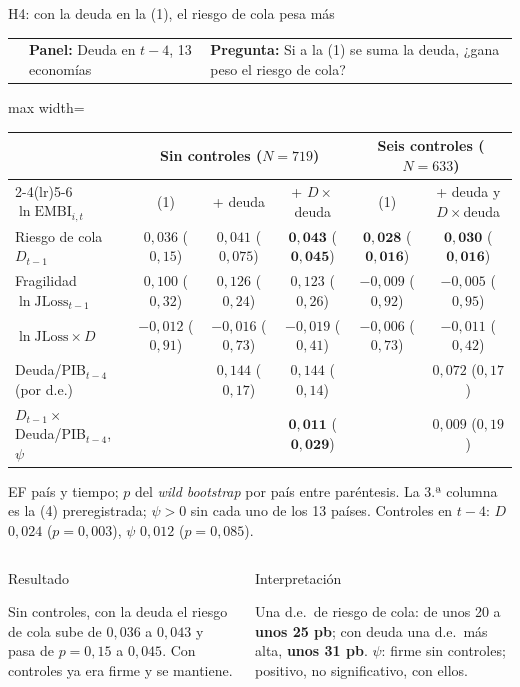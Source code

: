 \documentclass[aspectratio=169]{beamer}
\makeatletter
\newcommand{\JLoss}{\mathrm{JLoss}}
\newcommand{\EMBI}{\mathrm{EMBI}}
\newcommand{\franja}[3]{\par\vspace{-6pt}\noindent
\colorbox{tesisblue!10}{\begin{minipage}{\dimexpr\textwidth-2\fboxsep\relax}\scriptsize
\begin{tabular}{@{}>{\raggedright\arraybackslash}p{0.13\textwidth}@{\hspace{8pt}}>{\raggedright\arraybackslash}p{0.25\textwidth}@{\hspace{8pt}}>{\raggedright\arraybackslash}p{0.52\textwidth}@{}}
{\color{tesisblue}\bfseries Ecuación #1} & \textbf{Panel:} #2 & \textbf{Pregunta:} #3
\end{tabular}\end{minipage}}\par\vspace{4pt}}
\newcommand{\cajas}[2]{\par\vspace{4pt}
\begin{columns}[T]
\column{0.49\textwidth}
\begin{block}{Resultado}\scriptsize\raggedright #1\end{block}
\column{0.49\textwidth}
\begin{exampleblock}{Interpretación}\scriptsize\raggedright #2\end{exampleblock}
\end{columns}}
\makeatother
\begin{document}
\begin{frame}{H4: con la deuda en la (1), el riesgo de cola pesa más}
\franja{(1) + (4)}{Deuda en $t-4$, 13 economías}{Si a la (1) se suma la deuda, ¿gana peso el riesgo de cola?}
\centering
\footnotesize
\begin{adjustbox}{max width=\textwidth}
\begin{tabular}{l ccc cc}
\toprule
& \multicolumn{3}{c}{Sin controles ($N=719$)} & \multicolumn{2}{c}{Seis controles ($N=633$)} \\
\cmidrule(lr){2-4}\cmidrule(lr){5-6}
$\ln\EMBI_{i,t}$ & (1) & + deuda & + $D\times$deuda & (1) & + deuda y $D\times$deuda \\
\midrule
Riesgo de cola $D_{t-1}$ & $0{,}036$ \;($0{,}15$) & $0{,}041$ \;($0{,}075$) & $\mathbf{0{,}043}$ \;($\mathbf{0{,}045}$) & $\mathbf{0{,}028}$ \;($\mathbf{0{,}016}$) & $\mathbf{0{,}030}$ \;($\mathbf{0{,}016}$) \\
Fragilidad $\ln\JLoss_{t-1}$ & $0{,}100$ \;($0{,}32$) & $0{,}126$ \;($0{,}24$) & $0{,}123$ \;($0{,}26$) & $-0{,}009$ \;($0{,}92$) & $-0{,}005$ \;($0{,}95$) \\
$\ln\JLoss\times D$ & $-0{,}012$ \;($0{,}91$) & $-0{,}016$ \;($0{,}73$) & $-0{,}019$ \;($0{,}41$) & $-0{,}006$ \;($0{,}73$) & $-0{,}011$ \;($0{,}42$) \\
Deuda/PIB$_{t-4}$ (por d.e.) & & $0{,}144$ \;($0{,}17$) & $0{,}144$ \;($0{,}14$) & & $0{,}072$ \;($0{,}17$) \\
$D_{t-1}\times$ Deuda/PIB$_{t-4}$, $\psi$ & & & $\mathbf{0{,}011}$ \;($\mathbf{0{,}029}$) & & $0{,}009$ \;($0{,}19$) \\
\bottomrule
\end{tabular}
\end{adjustbox}

{\scriptsize\raggedright EF país y tiempo; $p$ del \textit{wild bootstrap} por país entre paréntesis. La 3.ª columna es la (4) preregistrada; $\psi>0$ sin cada uno de los 13 países. Controles en $t-4$: $D$ $0{,}024$ ($p=0{,}003$), $\psi$ $0{,}012$ ($p=0{,}085$).\par}
\vspace{-8pt}
\cajas{Sin controles, con la deuda el riesgo de cola sube de $0{,}036$ a $0{,}043$ y pasa de $p=0{,}15$ a $0{,}045$. Con controles ya era firme y se mantiene.}
{Una d.e.\ de riesgo de cola: de unos 20 a \textbf{unos 25 pb}; con deuda una d.e.\ más alta, \textbf{unos 31 pb}. $\psi$: firme sin controles; positivo, no significativo, con ellos.}
\end{frame}
\end{document}
